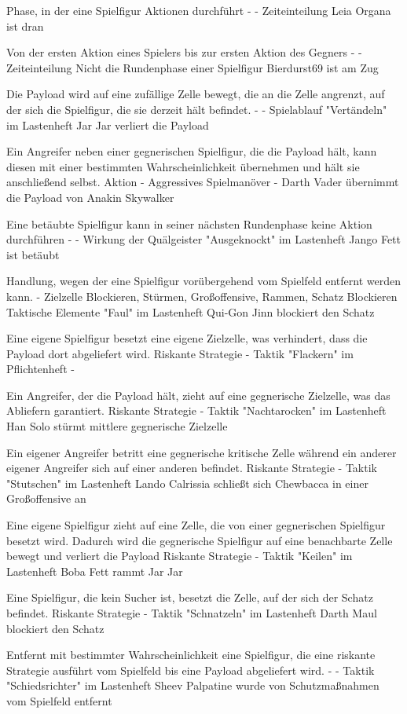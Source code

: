 {Phase, in der eine Spielfigur Aktionen durchführt}
{-}
{-}
{Zeiteinteilung}
{}
{Leia Organa ist dran}

{Von der ersten Aktion eines Spielers bis zur ersten Aktion des Gegners}
{-}
{-}
{Zeiteinteilung}
{Nicht die Rundenphase einer Spielfigur}
{Bierdurst69 ist am Zug}

{Die Payload wird auf eine zufällige Zelle bewegt, die an die Zelle angrenzt, auf der sich die Spielfigur, die sie derzeit hält befindet.}
{-}
{-}
{Spielablauf}
{"Vertändeln" im Lastenheft}
{Jar Jar verliert die Payload}

{Ein Angreifer neben einer gegnerischen Spielfigur, die die Payload hält, kann diesen mit einer bestimmten Wahrscheinlichkeit übernehmen und hält sie anschließend selbst.}
{Aktion}
{-}
{Aggressives Spielmanöver}
{-}
{Darth Vader übernimmt die Payload von Anakin Skywalker}

{Eine betäubte Spielfigur kann in seiner nächsten Rundenphase keine Aktion durchführen}
{-}
{-}
{Wirkung der Quälgeister}
{"Ausgeknockt" im Lastenheft}
{Jango Fett ist betäubt}

{Handlung, wegen der eine Spielfigur vorübergehend vom Spielfeld entfernt werden kann.}
{-}
{Zielzelle Blockieren, Stürmen, Großoffensive, Rammen, Schatz Blockieren}
{Taktische Elemente}
{"Faul" im Lastenheft}
{Qui-Gon Jinn blockiert den Schatz}

{Eine eigene Spielfigur besetzt eine eigene Zielzelle, was verhindert, dass die Payload dort abgeliefert wird.}
{Riskante Strategie}
{-}
{Taktik}
{"Flackern" im Pflichtenheft}
{-}

{Ein Angreifer, der die Payload hält, zieht auf eine gegnerische Zielzelle, was das Abliefern garantiert.}
{Riskante Strategie}
{-}
{Taktik}
{"Nachtarocken" im Lastenheft}
{Han Solo stürmt mittlere gegnerische Zielzelle}

{Ein eigener Angreifer betritt eine gegnerische kritische Zelle während ein anderer eigener Angreifer sich auf einer anderen befindet.}
{Riskante Strategie}
{-}
{Taktik}
{"Stutschen" im Lastenheft}
{Lando Calrissia schließt sich Chewbacca in einer Großoffensive an}

{Eine eigene Spielfigur zieht auf eine Zelle, die von einer gegnerischen Spielfigur besetzt wird. Dadurch wird die gegnerische Spielfigur auf eine benachbarte Zelle bewegt und verliert die Payload}
{Riskante Strategie}
{-}
{Taktik}
{"Keilen" im Lastenheft}
{Boba Fett rammt Jar Jar}

{Eine Spielfigur, die kein Sucher ist, besetzt die Zelle, auf der sich der Schatz befindet.}
{Riskante Strategie}
{-}
{Taktik}
{"Schnatzeln" im Lastenheft}
{Darth Maul blockiert den Schatz}

{Entfernt mit bestimmter Wahrscheinlichkeit eine Spielfigur, die eine riskante Strategie ausführt vom Spielfeld bis eine Payload abgeliefert wird.}
{-}
{-}
{Taktik}
{"Schiedsrichter" im Lastenheft}
{Sheev Palpatine wurde von Schutzmaßnahmen vom Spielfeld entfernt}
